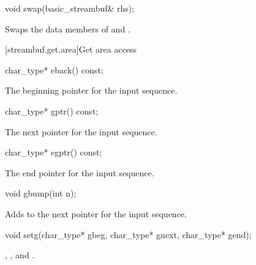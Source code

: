 %
\begin{itemdecl}
void swap(basic_streambuf& rhs);
\end{itemdecl}

\begin{itemdescr}
\pnum
\effects Swaps the data members of 
and .
\end{itemdescr}

[streambuf.get.area]{Get area access}

%
\begin{itemdecl}
char_type* eback() const;
\end{itemdecl}

\begin{itemdescr}
\pnum
\returns
The beginning pointer for the input sequence.
\end{itemdescr}

%
\begin{itemdecl}
char_type* gptr() const;
\end{itemdecl}

\begin{itemdescr}
\pnum
\returns
The next pointer for the input sequence.
\end{itemdescr}

%
\begin{itemdecl}
char_type* egptr() const;
\end{itemdecl}

\begin{itemdescr}
\pnum
\returns
The end pointer for the input sequence.
\end{itemdescr}

%
\begin{itemdecl}
void gbump(int n);
\end{itemdecl}

\begin{itemdescr}
\pnum
\effects
Adds  to the next pointer for the input sequence.
\end{itemdescr}

%
\begin{itemdecl}
void setg(char_type* gbeg, char_type* gnext, char_type* gend);
\end{itemdecl}

\begin{itemdescr}
\pnum
\ensures
{},
,
and
.
\end{itemdescr}

